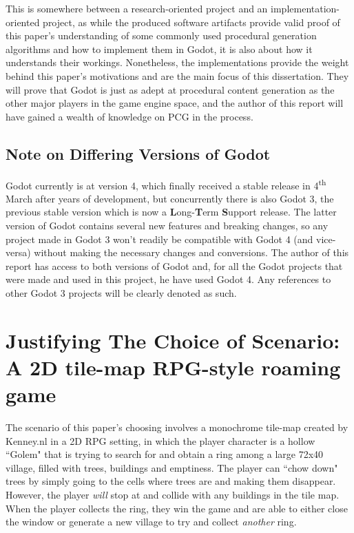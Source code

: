 This is somewhere between a research-oriented project and an implementation-oriented project, as while the produced software artifacts provide valid proof of this paper's understanding of some commonly used procedural generation algorithms and how to implement them in Godot, it is also about how it understands their workings. Nonetheless, the implementations provide the weight behind this paper's motivations and are the main focus of this dissertation. They will prove that Godot is just as adept at procedural content generation as the other major players in the game engine space, and the author of this report will have gained a wealth of knowledge on PCG in the process.

\subsection{Note on Differing Versions of Godot}

Godot currently is at version 4, which finally received a stable release in 4\textsuperscript{th} March after years of development, but concurrently there is also Godot 3, the previous stable version which is now a \textbf{L}ong-\textbf{T}erm \textbf{S}upport release. The latter version of Godot contains several new features and breaking changes, so any project made in Godot 3 won't readily be compatible with Godot 4 (and vice-versa) without making the necessary changes and conversions. The author of this report has access to both versions of Godot and, for all the Godot projects that were made and used in this project, he have used Godot 4. Any references to other Godot 3 projects will be clearly denoted as such.

\section{Justifying The Choice of Scenario: A 2D tile-map RPG-style roaming game}

The scenario of this paper's choosing involves a monochrome tile-map created by Kenney.nl in a 2D RPG setting, in which the player character is a hollow ``Golem" that is trying to search for and obtain a ring among a large 72x40 village, filled with trees, buildings and emptiness. The player can ``chow down" trees by simply going to the cells where trees are and making them disappear. However, the player \textit{will} stop at and collide with any buildings in the tile map. When the player collects the ring, they win the game and are able to either close the window or generate a new village to try and collect \textit{another} ring.

